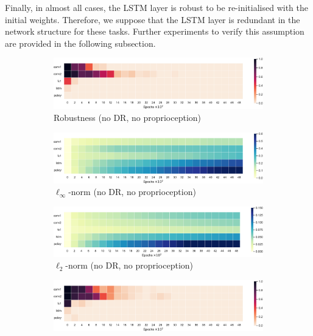 Finally, in almost all cases, the LSTM layer is robust to be re-initialised with the initial weights. Therefore, we suppose that the LSTM layer is redundant in the network structure for these tasks. Further experiments to verify this assumption are provided in the following subsection.

\begin{figure}[h!]
  \centering
  \begin{subfigure}{0.32\textwidth}
    \includegraphics[width=\textwidth]{figures/chapter6/robustness/fetch/visual_std/error}
    \caption{Robustness (no DR, no proprioception)}
  \end{subfigure}
  \begin{subfigure}{0.32\textwidth}
    \includegraphics[width=\textwidth]{figures/chapter6/robustness/fetch/visual_std/inf_dist}
    \caption{$\ell_\infty$-norm (no DR, no proprioception)}
  \end{subfigure}
  \begin{subfigure}{0.32\textwidth}
    \includegraphics[width=\textwidth]{figures/chapter6/robustness/fetch/visual_std/l2_dist}
    \caption{$\ell_2$-norm (no DR, no proprioception)}
  \end{subfigure}
  \begin{subfigure}{0.32\textwidth}
    \includegraphics[width=\textwidth]{figures/chapter6/robustness/fetch/sensor_std/error}

\end{subfigure}
\end{figure}
